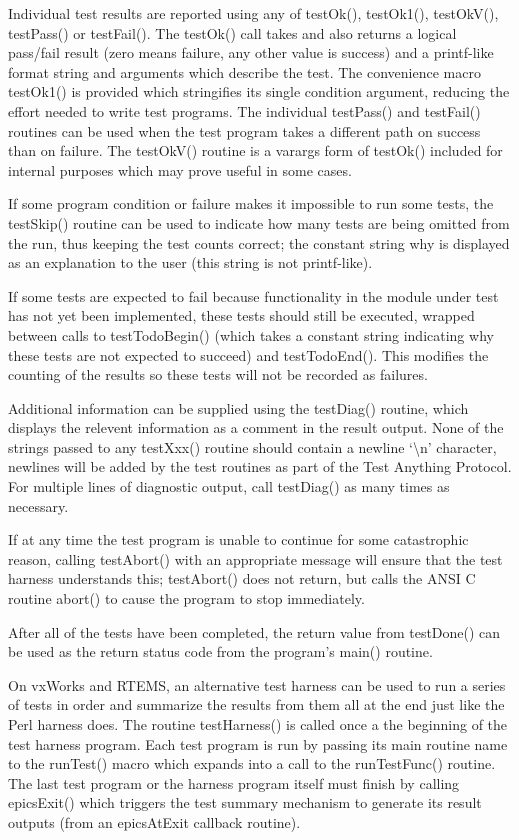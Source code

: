 Individual test results are reported using any of testOk(), testOk1(), testOkV(), testPass() or testFail(). The testOk() call 
takes and also returns a logical pass/fail result (zero means failure, any other value is success) and a printf-like format 
string and arguments which describe the test. The convenience macro testOk1() is provided which stringifies its single 
condition argument, reducing the effort needed to write test programs. The individual testPass() and testFail() routines can 
be used when the test program takes a different path on success than on failure. The testOkV() routine is a varargs form of 
testOk() included for internal purposes which may prove useful in some cases.

If some program condition or failure makes it impossible to run some tests, the testSkip() routine can be used to indicate 
how many tests are being omitted from the run, thus keeping the test counts correct; the constant string why is displayed 
as an explanation to the user (this string is not printf-like).

If some tests are expected to fail because functionality in the module under test has not yet been implemented, these tests 
should still be executed, wrapped between calls to testTodoBegin() (which takes a constant string indicating why these 
tests are not expected to succeed) and testTodoEnd(). This modifies the counting of the results so these tests will not be 
recorded as failures.

Additional information can be supplied using the testDiag() routine, which displays the relevent information as a 
comment in the result output. None of the strings passed to any testXxx() routine should contain a newline `\textbackslash{}n' character, 
newlines will be added by the test routines as part of the Test Anything Protocol.  For multiple lines of diagnostic output, 
call testDiag() as many times as necessary.

If at any time the test program is unable to continue for some catastrophic reason, calling testAbort() with an appropriate 
message will ensure that the test harness understands this; testAbort() does not return, but calls the ANSI C routine abort() 
to cause the program to stop immediately.

After all of the tests have been completed, the return value from testDone() can be used as the return status code from the 
program's main() routine.

On vxWorks and RTEMS, an alternative test harness can be used to run a series of tests in order and summarize the results 
from them all at the end just like the Perl harness does. The routine testHarness() is called once a the beginning of the test 
harness program. Each test program is run by passing its main routine name to the runTest() macro which expands into a 
call to the runTestFunc() routine. The last test program or the harness program itself must finish by calling epicsExit() 
which triggers the test summary mechanism to generate its result outputs (from an epicsAtExit callback routine).

